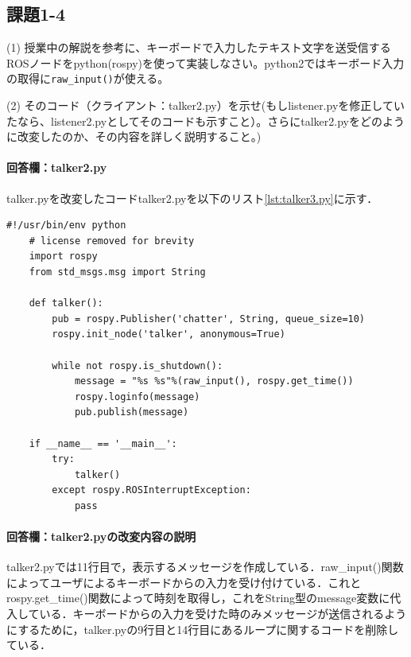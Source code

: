 \documentclass[12pt, xelatex,ja=standard,jafont=hiragino]{bxjsarticle}
\begin{document}
\subsection{課題1-4}
\begin{itembox}[l]{(1)}
授業中の解説を参考に、キーボードで入力したテキスト文字を送受信するROSノードをpython(rospy)を使って実装しなさい。python2ではキーボード入力の取得に\verb|raw_input()|が使える。
\end{itembox}

\begin{itembox}[l]{(2)}
そのコード（クライアント：talker2.py）を示せ(もしlistener.pyを修正していたなら、listener2.pyとしてそのコードも示すこと）。さらにtalker2.pyをどのように改変したのか、その内容を詳しく説明すること。)
\end{itembox}

\paragraph{回答欄：talker2.py}
talker.pyを改変したコードtalker2.pyを以下のリスト\ref{lst:talker3.py}に示す．

\begin{lstlisting}[caption=talker2.pyのコード,label=lst:talker2.py]
    #!/usr/bin/env python
    # license removed for brevity
    import rospy
    from std_msgs.msg import String

    def talker():
        pub = rospy.Publisher('chatter', String, queue_size=10)
        rospy.init_node('talker', anonymous=True)

        while not rospy.is_shutdown():
            message = "%s %s"%(raw_input(), rospy.get_time())
            rospy.loginfo(message)
            pub.publish(message)

    if __name__ == '__main__':
        try:
            talker()
        except rospy.ROSInterruptException:
            pass
\end{lstlisting}

\paragraph{回答欄：talker2.pyの改変内容の説明}
talker2.pyでは11行目で，表示するメッセージを作成している．raw_input()関数によってユーザによるキーボードからの入力を受け付けている．これとrospy.get_time()関数によって時刻を取得し，これをString型のmessage変数に代入している．キーボードからの入力を受けた時のみメッセージが送信されるようにするために，talker.pyの9行目と14行目にあるループに関するコードを削除している．
\end{document}
